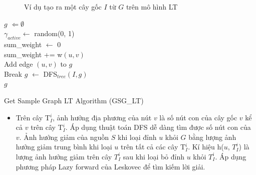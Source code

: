 \begin{figure}[H]
\hfill
{}\hfill
{}
\caption{Ví dụ tạo ra một cây gốc $I$ từ $G$ trên mô hình LT}
\label{example}
\end{figure}	
\begin{algorithm}[H]
$g$ $\Leftarrow \emptyset$
\\
{	
	$\gamma_{active} \leftarrow$ random(0, 1)
	\\
	sum\_weight $\leftarrow$ 0
	\\
	{
		sum\_weight += w$(u, v)$
		\\
		{
			Add edge $(u, v)$ to $g$
			\\
			Break
		}
	}
}		
$g$ $\leftarrow$ DFS$_{tree}$$(I,g)$
\\
\Return $g$
\caption{Get Sample Graph LT Algorithm (GSG\_{LT})}
\label{GSGLT}
\end{algorithm}	
\begin {itemize}
\item Trên cây T$_{I}^i$, ảnh hưởng địa phương của nút $v$ là số nút con của cây gốc $v$ kể cả $v$ trên cây T$_{I}^i$. Áp dụng thuật toán DFS dễ dàng tìm được số nút con của $v$. Ảnh hưởng giảm của nguồn $S$ khi loại đỉnh $u$ khỏi $G$ bằng lượng ảnh hưởng giảm trung bình khi loại $u$ trên tất cả các cây T$_{I}^i$. Kí hiệu h($u$, $T_I^i$) là lượng ảnh hưởng giảm trên cây $T_I^i$ sau khi loại bỏ đỉnh $u$ khỏi $T_I^i$. Áp dụng phương pháp Lazy forward của Leskovec \cite{lazy} để tìm kiếm lời giải. 
\end {itemize}
